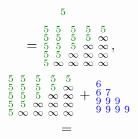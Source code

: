\begin{compactdesc}
\begin{gather*}
\begin{smallmatrix}
					\textcolor{black!50!green}{5}&&&&
				\end{smallmatrix}\\
				=
				\begin{smallmatrix}
					\textcolor{black!50!green}{5}&\textcolor{black!50!green}{5}&\textcolor{black!50!green}{5}&\textcolor{black!50!green}{5}&\textcolor{black!50!green}{5}\\
					\textcolor{black!50!green}{5}&\textcolor{black!50!green}{5}&\textcolor{black!50!green}{5}&\textcolor{black!50!green}{5}&\infty\\
					\textcolor{black!50!green}{5}&\textcolor{black!50!green}{5}&\textcolor{black!50!green}{5}&\infty&\infty\\
					\textcolor{black!50!green}{5}&\textcolor{black!50!green}{5}&\infty&\infty&\infty\\
					\textcolor{black!50!green}{5}&\infty&\infty&\infty&\infty
				\end{smallmatrix},
			\end{gather*}
			\begin{gather*}
				\begin{smallmatrix}
					\textcolor{black!50!green}{5}&\textcolor{black!50!green}{5}&\textcolor{black!50!green}{5}&\textcolor{black!50!green}{5}&\textcolor{black!50!green}{5}\\
					\textcolor{black!50!green}{5}&\textcolor{black!50!green}{5}&\textcolor{black!50!green}{5}&\textcolor{black!50!green}{5}&\infty\\
					\textcolor{black!50!green}{5}&\textcolor{black!50!green}{5}&\textcolor{black!50!green}{5}&\infty&\infty\\
					\textcolor{black!50!green}{5}&\textcolor{black!50!green}{5}&\infty&\infty&\infty\\
					\textcolor{black!50!green}{5}&\infty&\infty&\infty&\infty
				\end{smallmatrix}
				+
				\begin{smallmatrix}
					&&&&\\
					\textcolor{blue}{6}&&&&\\
					\textcolor{blue}{6}&\textcolor{blue}{7}&&&\\
					\textcolor{blue}{9}&\textcolor{blue}{9}&\textcolor{blue}{9}&&\\
					\textcolor{blue}{9}&\textcolor{blue}{9}&\textcolor{blue}{9}&\textcolor{blue}{9}&\\
				\end{smallmatrix}\\
				=
				\begin{smallmatrix}

\end{smallmatrix}
\end{gather*}
\end{compactdesc}

